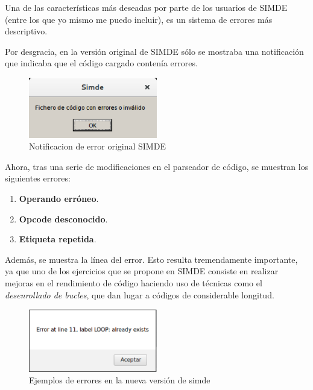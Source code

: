 Una de las características más deseadas por parte de los usuarios de SIMDE 
(entre los que yo mismo me puedo incluir), es un sistema de errores más descriptivo. 

\bigskip
Por desgracia, en la versión original de SIMDE sólo se mostraba una notificación que indicaba
que el código cargado contenía errores.

\begin{figure}[!th]
\begin{center}
\includegraphics[width=0.5\textwidth]{images/cap6/errorsimde.eps}
\caption{Notificacion de error original SIMDE}
\end{center}
\end{figure}

Ahora, tras una serie de modificaciones en el parseador de código, se muestran los siguientes errores:

\begin{enumerate}
\item \textbf{Operando erróneo}.
\item \textbf{Opcode desconocido}.
\item \textbf{Etiqueta repetida}.
\end{enumerate}

Además, se muestra la línea del error. Esto resulta tremendamente importante, 
ya que uno de los ejercicios que se propone en SIMDE consiste en realizar mejoras en el rendimiento
de código haciendo uso de técnicas como el \textit{desenrollado de bucles}, que dan lugar a códigos de considerable
longitud.

\begin{figure}[!th]
\begin{center}
\includegraphics[width=0.5\textwidth]{images/cap6/nuevoerrorsimde.eps}
\caption{Ejemplos de errores en la nueva versión de simde}
\end{center}
\end{figure}

